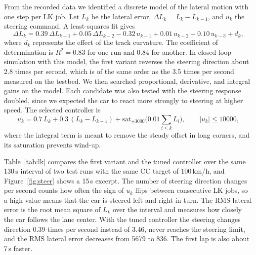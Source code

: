 \documentclass[11pt,a4paper]{article}
\begin{document}
From the recorded data we identified a discrete model of the lateral motion with one step per LK
job. Let $L_k$ be the lateral error, $\Delta L_k = L_k - L_{k-1}$, and $u_k$ the steering command.
A least-squares fit gives
\begin{equation}
\Delta L_k = 0.39\,\Delta L_{k-1} + 0.05\,\Delta L_{k-2} - 0.32\,u_{k-1} + 0.01\,u_{k-2} + 0.10\,u_{k-3} + d_k ,
\end{equation}
where $d_k$ represents the effect of the track curvature. The coefficient of determination is
$R^2 = 0.83$ for one run and $0.84$ for another. In closed-loop simulation with this model, the
first variant reverses the steering direction about 2.8 times per second, which is of the same order
as the 3.5 times per second measured on the testbed. We then searched proportional, derivative, and integral gains on the
model. Each candidate was also tested with the steering response doubled, since we expected the car to react
more strongly to steering at higher speed. The selected controller is
\begin{equation}
u_k = 0.7\,L_k + 0.3\,(L_k - L_{k-1}) + \mathrm{sat}_{\pm 3000}\Big(0.01 \sum_{i \le k} L_i\Big),
\qquad |u_k| \le 10000 ,
\end{equation}
where the integral term is meant to remove the steady offset in long corners, and its saturation
prevents wind-up.

Table~\ref{tab:lk} compares the first variant and the tuned controller over the same 130\,s interval
of two test runs with the same CC target of 100\,km/h, and Figure~\ref{fig:steer} shows a 15\,s
excerpt. The number of steering direction changes per second counts how often the sign of $u_k$
flips between consecutive LK jobs, so a high value means that the car is steered left and right
in turn. The RMS lateral error is the root mean square of $L_k$ over the interval and measures how
closely the car follows the lane center. With the tuned controller the steering changes direction 0.39 times per second instead of
3.46, never reaches the steering limit, and the RMS lateral error decreases from 5679 to 836. The
first lap is also about 7\,s faster.
\end{document}
